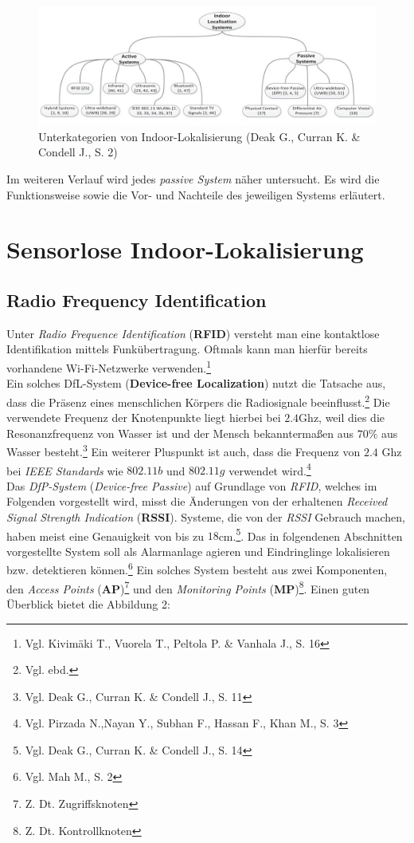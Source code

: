 \begin{figure}[H]
	\centering
	\includegraphics[scale=0.9]{pictures/indoor_loc}
	\caption{Unterkategorien von Indoor-Lokalisierung (Deak G.,  Curran K. \& Condell J., S. 2)}
\end{figure}

Im weiteren Verlauf wird jedes \textit{passive System} näher untersucht. Es wird die Funktionsweise sowie die Vor- und Nachteile des jeweiligen Systems erläutert.


\section{Sensorlose Indoor-Lokalisierung}
\subsection{Radio Frequency Identification}
Unter \textit{Radio Frequence Identification} (\textbf{RFID}) versteht man eine kontaktlose Identifikation mittels Funkübertragung. Oftmals kann man hierfür bereits vorhandene Wi-Fi-Netzwerke verwenden.\footnote{Vgl. Kivimäki T., Vuorela T., Peltola P. \& Vanhala J., S.  16} \\
Ein solches DfL-System (\textbf{Device-free Localization}) nutzt die Tatsache aus, dass die Präsenz eines menschlichen Körpers die Radiosignale beeinflusst.\footnote{Vgl. ebd.} Die verwendete Frequenz der Knotenpunkte liegt hierbei bei $2.4$Ghz, weil dies die Resonanzfrequenz von Wasser ist und der Mensch bekanntermaßen aus $70\%$ aus Wasser besteht.\footnote{Vgl. Deak G.,  Curran K. \& Condell J., S. 11} Ein weiterer Pluspunkt ist auch, dass die Frequenz von $2.4$ Ghz bei \textit{IEEE Standards} wie $802.11b$ und $802.11g$ verwendet wird.\footnote{Vgl. Pirzada N.,Nayan Y., Subhan F., Hassan F., Khan M., S. 3}\\
Das \textit{DfP-System} (\textit{Device-free Passive}) auf Grundlage von \textit{RFID}, welches im Folgenden vorgestellt wird, misst die Änderungen von der erhaltenen \textit{Received Signal Strength Indication} (\textbf{RSSI}). Systeme, die von der \textit{RSSI} Gebrauch machen, haben meist eine Genauigkeit von bis zu $18$cm.\footnote{Vgl. Deak G.,  Curran K. \& Condell J., S. 14}. Das in folgendenen Abschnitten vorgestellte System soll als Alarmanlage agieren und Eindringlinge lokalisieren bzw. detektieren können.\footnote{Vgl. Mah M., S. 2} Ein solches System besteht aus zwei Komponenten, den \textit{Access Points} (\textbf{AP})\footnote{Z. Dt. Zugriffsknoten} und den \textit{Monitoring Points} (\textbf{MP})\footnote{Z. Dt. Kontrollknoten}. Einen guten Überblick bietet die Abbildung 2:\\

